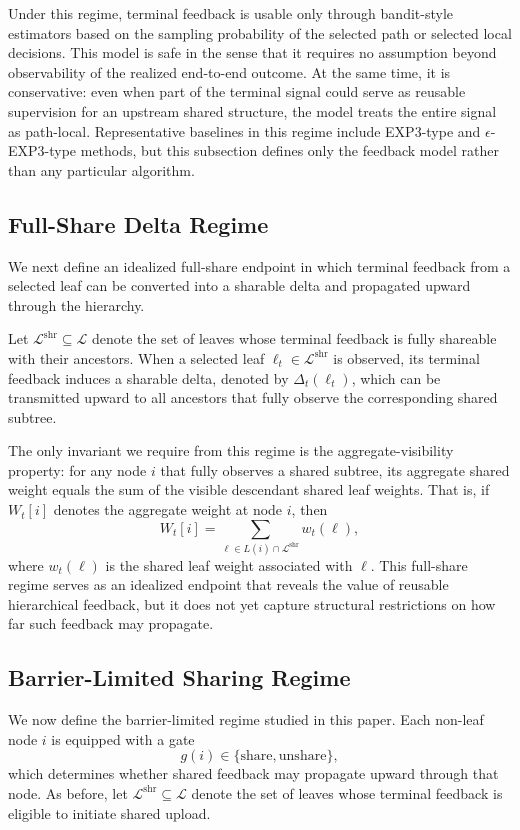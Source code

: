 Under this regime, terminal feedback is usable only through bandit-style estimators based on the sampling probability of the selected path or selected local decisions. This model is safe in the sense that it requires no assumption beyond observability of the realized end-to-end outcome. At the same time, it is conservative: even when part of the terminal signal could serve as reusable supervision for an upstream shared structure, the model treats the entire signal as path-local. Representative baselines in this regime include EXP3-type and $\epsilon$-EXP3-type methods, but this subsection defines only the feedback model rather than any particular algorithm.

\subsection{Full-Share Delta Regime}

We next define an idealized full-share endpoint in which terminal feedback from a selected leaf can be converted into a sharable delta and propagated upward through the hierarchy.

Let $\mathcal{L}^{\mathrm{shr}} \subseteq \mathcal{L}$ denote the set of leaves whose terminal feedback is fully shareable with their ancestors. When a selected leaf $\ell_t \in \mathcal{L}^{\mathrm{shr}}$ is observed, its terminal feedback induces a sharable delta, denoted by $\Delta_t(\ell_t)$, which can be transmitted upward to all ancestors that fully observe the corresponding shared subtree.

The only invariant we require from this regime is the aggregate-visibility property: for any node $i$ that fully observes a shared subtree, its aggregate shared weight equals the sum of the visible descendant shared leaf weights. That is, if $W_t[i]$ denotes the aggregate weight at node $i$, then
\[
W_t[i] = \sum_{\ell \in L(i) \cap \mathcal{L}^{\mathrm{shr}}} w_t(\ell),
\]
where $w_t(\ell)$ is the shared leaf weight associated with $\ell$. This full-share regime serves as an idealized endpoint that reveals the value of reusable hierarchical feedback, but it does not yet capture structural restrictions on how far such feedback may propagate.

\subsection{Barrier-Limited Sharing Regime}

We now define the barrier-limited regime studied in this paper. Each non-leaf node $i$ is equipped with a gate
\[
g(i) \in \{\mathrm{share}, \mathrm{unshare}\},
\]
which determines whether shared feedback may propagate upward through that node. As before, let $\mathcal{L}^{\mathrm{shr}} \subseteq \mathcal{L}$ denote the set of leaves whose terminal feedback is eligible to initiate shared upload.

